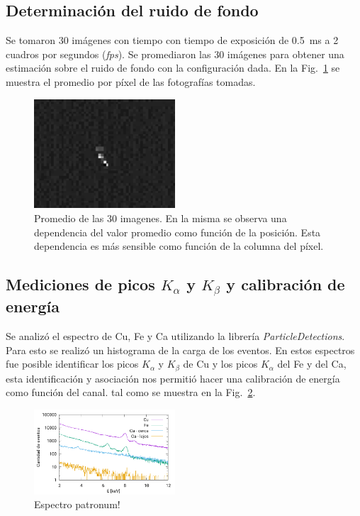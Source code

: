 \documentclass[twoside,twocolumn]{article}
\begin{document}
    \subsection{Determinación del ruido de fondo}\label{sec:results:background}
      Se tomaron 30 imágenes con tiempo con tiempo de exposición de \SI{0.5}{\milli\second} a 2 cuadros por segundos (\emph{fps}).
      Se promediaron las 30 imágenes para obtener una estimación sobre el ruido de fondo con la configuración dada. 
      En la Fig.~\ref{fig:background} se muestra el promedio por píxel de las fotografías tomadas.

      \begin{figure}[h]
        \includegraphics[width=0.47\textwidth]{figures/06-04-18_09-27-42.eps} %
        \caption{Promedio de las 30 imagenes.
          En la misma se observa una dependencia del valor promedio como función de la posición.
          Esta dependencia es más sensible como función de la columna del píxel. }
        \label{fig:background}
      \end{figure}

    \subsection{Mediciones de picos $K_{\alpha}$ y $K_{\beta}$ y calibración de energía}\label{sec:results:peaks}
      Se analizó el espectro de Cu, Fe y Ca utilizando la librería \emph{ParticleDetections}.
      Para esto se realizó un histograma de la carga de los eventos.
      En estos espectros fue posible identificar los picos $K_{\alpha}$ y $K_{\beta}$ de Cu y los picos $K_{\alpha}$ del Fe y del Ca,
      esta identificación y asociación nos permitió hacer una calibración de energía como función del canal.
      tal como se muestra en la Fig.~\ref{fig:spectrum_x-ray}.
      
      \begin{figure}[h]
        \includegraphics[width=0.47\textwidth]{figures/x-ray_spectrum.pdf}
        \caption{Espectro patronum!}
        \label{fig:spectrum_x-ray}
      \end{figure}
\end{document}
